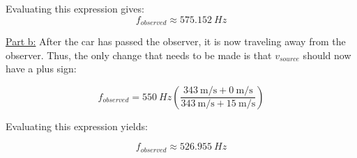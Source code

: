 \begin{mdframed}[backgroundcolor=blue!10!white]
	
	
Evaluating this expression gives: 
	\begin{equation*}
	\boxed{f_{observed} \approx \SI{575.152}{Hz}}
	\end{equation*}
	
	
		\underline{Part b:} After the car has passed the observer, it is now traveling away from the observer.  Thus, the only change that needs to be made is that $v_{source}$ should now have a plus sign:
	
		\begin{equation*}
	f_{observed} = \SI{550}{Hz}(\frac{\SI[per-mode = symbol]{343}{\m\per\s} + \SI[per-mode = symbol]{0}{\m\per\s}}{{\SI[per-mode = symbol]{343}{\m\per\s} + \SI[per-mode = symbol]{15}{\m\per\s}}})
	\end{equation*}
	
	Evaluating this expression yields: 
	
		\begin{equation*}
	\boxed{f_{observed} \approx \SI{526.955}{Hz}}
	\end{equation*}
	
	
	
\end{mdframed}	
	
	
	
	
	
	
	
	
	
	
	
	
	
	
	
	
	
	
	\newpage
	
	
	
	
	
	
	
	
	
	
	
	
	
	
	
	
	
	
	
	
	
	
	
	
	
	
	
	
	
	
	
	
	
	
	
	
	
	
	
	
	
	
	
